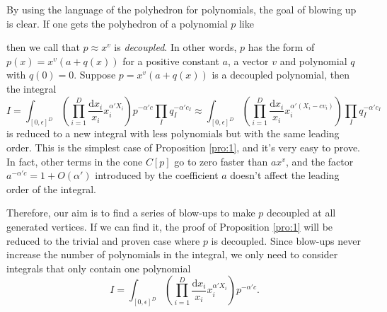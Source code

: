 \documentclass[12pt]{article}
\theoremstyle{definition}
\theoremstyle{plain}
\newcommand{\dif}{\mathrm{d}} %
\begin{document}
By using the language of the polyhedron for polynomials, the goal of blowing up is clear.
If one gets the polyhedron of a polynomial $p$ like
\begin{center}
\end{center}
then we call that $p\approx x^v$ is \emph{decoupled}. In other words, $p$ 
has the form of $p(x)=x^v(a+q(x))$ for a positive constant $a$, a vector $v$ and 
polynomial $q$ with $q(0)=0$. Suppose $p=x^v(a+q(x))$ is a decoupled polynomial, then
the integral
\[
	I=\int_{[0,\epsilon]^D} \left(\prod_{i=1}^D\frac{\dif x_i}{x_i}x_i^{\alpha' X_i}\right)
	p^{-\alpha' c} \prod_I q_I^{-\alpha' c_I}
	\approx\int_{[0,\epsilon]^D} \left(\prod_{i=1}^D\frac{\dif x_i}{x_i}x_i^{\alpha' (X_i-cv_i)}\right)
	\prod_I q_I^{-\alpha' c_I}
\] 
is reduced to a new integral with less polynomials but with the same leading order. 
This is the simplest case of Proposition \ref{pro:1}, and it's very easy to prove.
In fact, other terms in the cone $C[p]$ go to zero faster than $a x^v$,
and the factor $a^{-\alpha'c}=1+O(\alpha')$ introduced by the coefficient $a$ 
doesn't affect the leading order of the integral.

Therefore, our aim is to find a series of blow-ups to make $p$ decoupled at 
all generated vertices.
If we can find it, the proof of Proposition \ref{pro:1} will be reduced to the trivial 
and proven case where $p$ is decoupled.
Since blow-ups never increase the number of polynomials in the integral, 
we only need to consider integrals that only contain one 
polynomial
\[
	I=\int_{[0,\epsilon]^D} \left(\prod_{i=1}^D\frac{\dif x_i}{x_i}x_i^{\alpha' X_i}\right)
	p^{-\alpha' c}.
\] 
\end{document}
